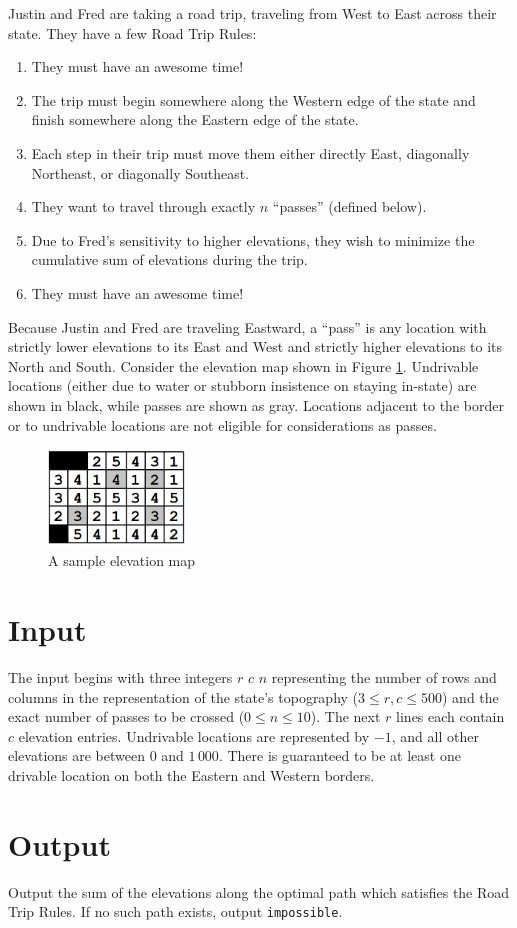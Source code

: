 Justin and Fred are taking a road trip, traveling from West to East
across their state. They have a few Road Trip Rules:
\begin{enumerate}
\item They must have an awesome time!
\item The trip must begin somewhere along the Western edge of the state
and finish somewhere along the Eastern edge of the state.
\item Each step in their trip must move them either directly East,
diagonally Northeast, or diagonally Southeast.
\item They want to travel through exactly $n$ ``passes'' (defined below).
\item Due to Fred's sensitivity to higher elevations, they wish to minimize
the cumulative sum of elevations during the trip.
\item They must have an awesome time!
\end{enumerate}
Because Justin and Fred are traveling Eastward, a ``pass'' is any location
with strictly lower elevations to its East and West and strictly higher
elevations to its North and South. Consider the elevation map 
shown in Figure \ref{fig1:just}.
Undrivable locations (either due to water or stubborn insistence on
staying in-state) are shown in black, while passes are shown as gray.
Locations adjacent to the border or to undrivable locations are not
eligible for considerations as passes.

\begin{figure}[!h]
\centering
\includegraphics[width=0.33\textwidth]{pic1}
\caption{A sample elevation map}
\label{fig1:just}
\end{figure}

\section*{Input}
The input begins with three integers $r$ $c$ $n$ representing the
number of rows and columns in the representation of the state's topography
($3 \leq r, c \leq 500$) and the exact number of passes to be crossed
($0 \leq n \leq 10$). The next $r$ lines each contain
$c$ elevation entries. Undrivable locations are represented by
$-1$, and all other elevations are between $0$ and $1\, 000$. There is
guaranteed to be at least one drivable location on both the Eastern and
Western borders.

\section*{Output}
Output the sum of the elevations along the optimal path which satisfies
the Road Trip Rules. If no such path exists, output \texttt{impossible}.
